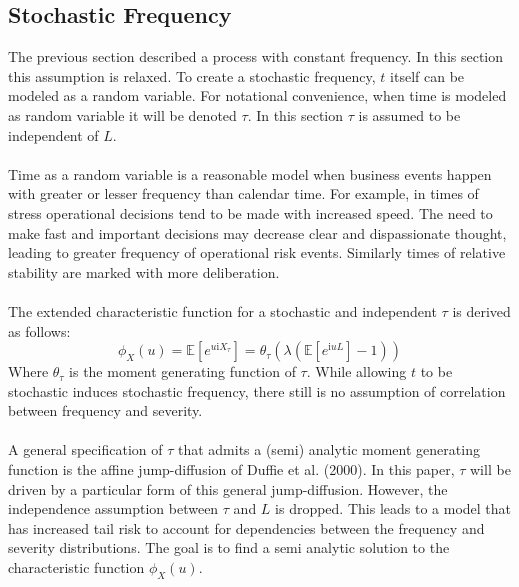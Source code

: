 \documentclass{article}
\theoremstyle{definition}
\begin{document}
\subsection{Stochastic Frequency}
The previous section described a process with constant frequency.  In this section this assumption is relaxed.  To create a stochastic frequency, \(t\) itself can be modeled as a random variable.  For notational convenience, when time is modeled as random variable it will be denoted \(\tau\).  In this section \(\tau\) is assumed to be independent of \(L\). 
\\
\\
Time as a random variable is a reasonable model when business events happen with greater or lesser frequency than calendar time.  For example, in times of stress operational decisions tend to be made with increased speed.  The need to make fast and important decisions may decrease clear and dispassionate thought, leading to greater frequency of operational risk events.  Similarly times of relative stability are marked with more deliberation.  
\\
\\
The extended characteristic function for a stochastic and independent \(\tau\) is derived as follows: 
\begin{equation}\label{uncorrelatedCF}\phi_X(u)=\mathbb{E}[e^{u\mathrm{i}X_\tau}]=\theta_\tau \left(\lambda \left(\mathbb{E}\left[e^{\mathrm{i}uL}\right]-1\right)\right)\end{equation}
Where \(\theta_\tau\) is the moment generating function of \(\tau\).  While allowing \(t\) to be stochastic induces stochastic frequency, there still is no assumption of correlation between frequency and severity.
\\
\\
A general specification of \(\tau\) that admits a (semi) analytic moment generating function is the affine jump-diffusion of Duffie et al. (2000). In this paper, \(\tau\) will be driven by a particular form of this general jump-diffusion. However, the independence assumption between \(\tau\) and \(L\) is dropped.  This leads to a model that has increased tail risk to account for dependencies between the frequency and severity distributions.  The goal is to find a semi analytic solution to the characteristic function \(\phi_X(u)\).
\end{document}
